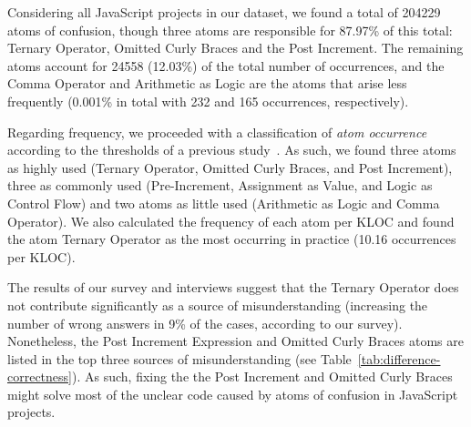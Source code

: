 Considering all JavaScript projects in our dataset, we found 
a total of \num{204229} atoms of confusion, though three atoms are responsible for 87.97\% of this total: Ternary Operator, Omitted Curly Braces and the Post Increment. The remaining atoms
account for \num{24558} (12.03\%) of the total number of occurrences, and the Comma Operator and Arithmetic as Logic are the atoms that arise less frequently (0.001\% in total with 232 and 165 occurrences, respectively). 

Regarding frequency, we proceeded with a classification of \emph{atom occurrence}
according to the thresholds of a previous
study~\cite{DBLP:journals/ese/MedeirosLAAKRG19}. As such, we found three
atoms as highly used (Ternary Operator, Omitted Curly Braces, and Post Increment),
three as commonly used (Pre-Increment, Assignment as Value, and Logic as Control Flow)
and two atoms as little used (Arithmetic as Logic and Comma Operator).
We also calculated the frequency of each atom per KLOC and found the atom
Ternary Operator as the most occurring in practice (10.16 occurrences per KLOC).

The results of our survey and interviews suggest that the Ternary Operator does not contribute significantly as a source of misunderstanding (increasing the number of wrong answers in 9\% of the cases, according to our survey). Nonetheless, the Post Increment Expression and Omitted Curly Braces atoms are listed in the top three sources of misunderstanding 
(see Table~\ref{tab:difference-correctness}). As such, fixing the the Post Increment and Omitted Curly Braces might solve most of the unclear code caused by atoms of confusion
in JavaScript projects. 
